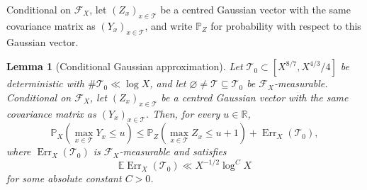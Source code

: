 \documentclass[a4paper,12pt,reqno]{amsart}
\numberwithin{equation}{section}
\newtheorem{lemma}[theorem]{Lemma}
\theoremstyle{remark}
\newcommand{\R}{\mathbb{R}}
\newcommand{\E}{\mathbb{E}}
\newcommand{\p}{\mathbb{P}}
\begin{document}
Conditional on \(\mathscr F_X\), let
\((Z_x)_{x\in\mathcal T}\) be a centred Gaussian vector with the same
covariance matrix as \((Y_x)_{x\in\mathcal T}\), and write \(\p_Z\)
for probability with respect to this Gaussian vector.

\begin{lemma}[Conditional Gaussian approximation]
\label{lem:conditional-stein}
Let
\(
\mathcal T_0\subset[X^{8/7},X^{4/3}/4]
\)
be deterministic with
\(\#\mathcal T_0\ll\log X\), and let
\(\varnothing\ne\mathcal T\subseteq\mathcal T_0\) be
\(\mathscr F_X\)-measurable.
Conditional on \(\mathscr F_X\), let
\((Z_x)_{x\in\mathcal T}\) be a centred Gaussian vector with the same
covariance matrix as \((Y_x)_{x\in\mathcal T}\).
Then, for every \(u\in\R\),
\begin{equation}\label{eq:stein-max}
 \p_X\left(\max_{x\in\mathcal T}Y_x\leq u\right)
 \leq
 \p_Z\left(\max_{x\in\mathcal T}Z_x\leq u+1\right)
 +\operatorname{Err}_X(\mathcal T_0),
\end{equation}
where \(\operatorname{Err}_X(\mathcal T_0)\) is
\(\mathscr F_X\)-measurable and satisfies
\begin{equation}\label{eq:stein-error-mean}
 \E\operatorname{Err}_X(\mathcal T_0)
 \ll X^{-1/2}\log^C X
\end{equation}
for some absolute constant \(C>0\).
\end{lemma}
\end{document}
